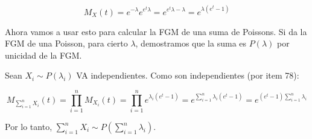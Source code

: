 \begin{enumerate}
		$$M_X(t) = e^{-\lambda} e^{e^t\lambda} = e^{e^t\lambda-\lambda} = e^{\lambda (e^t-1)}$$
		
		Ahora vamos a usar esto para calcular la FGM de una suma de Poissons.
		Si da la FGM de una Poisson, para cierto $\lambda$, demostramos que la suma es $P(\lambda)$ por unicidad de la FGM.
		
		Sean $X_i \sim P(\lambda_i)$ VA independientes.
		Como son independientes (por item 78):
		
		$$M_{\sum_{i=1}^n X_i}(t) = \prod_{i=1}^n M_{X_i}(t) = \prod_{i=1}^n e^{\lambda_i (e^t-1)} = e^{\sum_{i=1}^n \lambda_i (e^t-1)}
		= e^{(e^t-1) \sum_{i=1}^n \lambda_i}$$
		
		Por lo tanto, $\sum_{i=1}^n X_i \sim P(\sum_{i=1}^n \lambda_i)$.
\end{enumerate}
